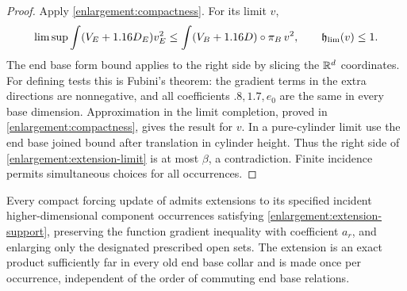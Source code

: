 \begin{proof}
Apply \cref{enlargement:compactness}.  For its limit $v$,
\begin{equation}\label{enlargement:extension-limit}
 \limsup\int(V_E+1.16D_E)v_E^2
 \le\int(V_B+1.16D)\circ\pi_B\,v^2,
 \qquad \mathfrak h_{\rm lim}(v)\le1.
\end{equation}
The end base form bound applies to the right side by slicing the $\mathbb R^d$
coordinates.  For defining tests this is Fubini's theorem: the gradient
terms in the extra directions are nonnegative, and all coefficients
$.8,1.7,e_0$ are the same in every base dimension.  Approximation in the
limit completion, proved in \cref{enlargement:compactness}, gives the result
for $v$.  In a pure-cylinder limit use the end base joined bound after
translation in cylinder height.  Thus the right side of
\cref{enlargement:extension-limit} is at most $\beta$, a contradiction.
Finite incidence permits simultaneous choices for all occurrences.
\end{proof}

\begin{lemma}\label{enlargement:normal-functions}
Every compact forcing update of  admits
extensions to its specified incident higher-dimensional component occurrences satisfying \cref{enlargement:extension-support}, preserving the
function gradient inequality with coefficient $a_r$, and enlarging only
the designated prescribed open sets.  The extension is an exact product sufficiently
far in every old end base collar and is made once per occurrence, independent
of the order of commuting end base relations.
\end{lemma}

